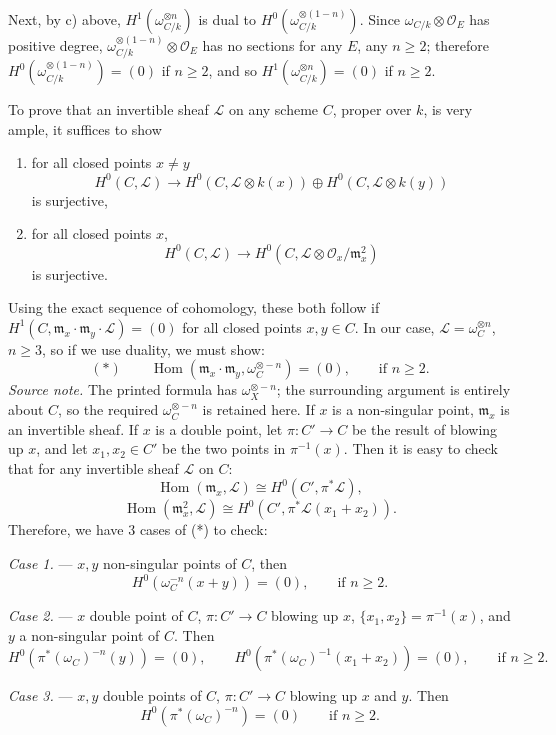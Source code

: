 \documentclass[10pt]{article}
\newcommand{\Hom}{\operatorname{Hom}}
\newcommand{\cO}{\mathcal O}
\newcommand{\cL}{\mathcal L}
\begin{document}
Next, by c) above, $H^1(\omega_{C/k}^{\otimes n})$ is dual to $H^0(\omega_{C/k}^{\otimes(1-n)})$. Since $\omega_{C/k}\otimes\cO_E$ has positive degree, $\omega_{C/k}^{\otimes(1-n)}\otimes\cO_E$ has no sections for any $E$, any $n\geq 2$; therefore $H^0(\omega_{C/k}^{\otimes(1-n)})=(0)$ if $n\geq 2$, and so $H^1(\omega_{C/k}^{\otimes n})=(0)$ if $n\geq 2$.

To prove that an invertible sheaf $\cL$ on any scheme $C$, proper over $k$, is very ample, it suffices to show
\begin{enumerate}[label=\alph*)]
\item for all closed points $x\ne y$
\[
H^0(C,\cL)\to H^0(C,\cL\otimes k(x))\oplus H^0(C,\cL\otimes k(y))
\]
is surjective,
\item for all closed points $x$,
\[
H^0(C,\cL)\to H^0(C,\cL\otimes \cO_x/\mathfrak m_x^2)
\]
is surjective.
\end{enumerate}
Using the exact sequence of cohomology, these both follow if $H^1(C,\mathfrak m_x\cdot \mathfrak m_y\cdot\cL)=(0)$ for all closed points $x,y\in C$. In our case, $\cL=\omega_C^{\otimes n}$, $n\geq 3$, so if we use duality, we must show:
\[
(*)\qquad \Hom(\mathfrak m_x\cdot \mathfrak m_y,\omega_C^{\otimes -n})=(0),\qquad \text{if } n\geq 2.
\]
\noindent\emph{Source note.} The printed formula has $\omega_X^{\otimes -n}$; the surrounding argument is entirely about $C$, so the required $\omega_C^{\otimes -n}$ is retained here.
If $x$ is a non-singular point, $\mathfrak m_x$ is an invertible sheaf. If $x$ is a double point, let $\pi:C'\to C$ be the result of blowing up $x$, and let $x_1,x_2\in C'$ be the two points in $\pi^{-1}(x)$. Then it is easy to check that for any invertible sheaf $\cL$ on $C$:
\[
\Hom(\mathfrak m_x,\cL)\cong H^0(C',\pi^*\cL),
\]
\[
\Hom(\mathfrak m_x^2,\cL)\cong H^0(C',\pi^*\cL(x_1+x_2)).
\]
Therefore, we have 3 cases of (*) to check:

\medskip
\noindent\textit{Case 1.} --- $x,y$ non-singular points of $C$, then
\[
H^0(\omega_C^{-n}(x+y))=(0),\qquad \text{if } n\geq 2.
\]

\medskip
\noindent\textit{Case 2.} --- $x$ double point of $C$, $\pi:C'\to C$ blowing up $x$, $\{x_1,x_2\}=\pi^{-1}(x)$, and $y$ a non-singular point of $C$. Then
\[
H^0(\pi^*(\omega_C)^{-n}(y))=(0),\qquad H^0(\pi^*(\omega_C)^{-1}(x_1+x_2))=(0),\qquad \text{if } n\geq 2.
\]

\medskip
\noindent\textit{Case 3.} --- $x,y$ double points of $C$, $\pi:C'\to C$ blowing up $x$ and $y$. Then
\[
H^0(\pi^*(\omega_C)^{-n})=(0)\qquad \text{if } n\geq 2.
\]
\end{document}
